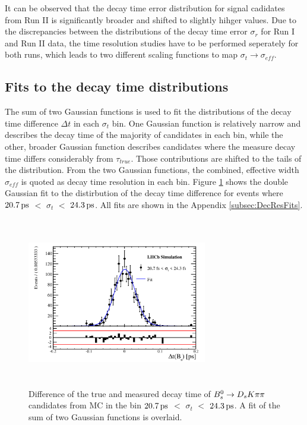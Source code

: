 It can be observed that the decay time error distribution for signal cadidates from Run II is significantly broader and shifted to slightly hihger values.
Due to the discrepancies between the distributions of the decay time error $\sigma_{r}$ for Run I and Run II data, the time resolution studies have to be performed seperately for both runs, 
which leads to two different scaling functions to map $\sigma_{t} \to \sigma_{eff}$. 


\subsection{Fits to the decay time distributions}

The sum of two Gaussian functions is used to fit the distributions of the decay time difference $\Delta t$ in each $\sigma_{t}$ bin.
One Gaussian function is relatively narrow and describes the decay time of the majority of candidates in each bin, 
while the other, broader Gaussian function describes candidates where the measure decay time differs considerably from $\tau_{true}$. 
Those contributions are shifted to the tails of the distribution. From the two Gaussian functions, the combined, effective width $\sigma_{eff}$ is quoted as decay time resolution in each bin. 
Figure \ref{fig:ResoFit_24to29} shows the double Gaussian fit to the distirbution of the decay time difference for events where $20.7{\mathrm{ \,ps}}$ $<$ $\sigma_{t}$ $<$ $24.3{\mathrm{ \,ps}}$. 
All fits are shown in the Appendix \ref{subsec:DecResFits}. \newline

\begin{figure}[h]
\includegraphics[height=7.4cm,width=0.7\textwidth]{figs/Resolution/SignalMC_bin_2.pdf}
\caption{Difference of the true and measured decay time of ${{B}^0_{s}}\rightarrow{\ensuremath{{D}_{s}}}{\ensuremath{K}}{\ensuremath{\pi}}{\ensuremath{\pi}}$ candidates from MC in the bin $20.7{\mathrm{ \,ps}}$ $<$ $\sigma_{t}$ $<$ $24.3{\mathrm{ \,ps}}$. A fit of the sum of two Gaussian functions is overlaid.}
\label{fig:ResoFit_24to29}
\end{figure}


